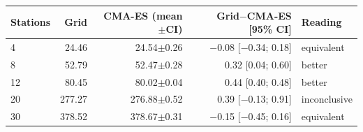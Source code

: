 \begin{tabular}{lrrrl}
\toprule
Stations & Grid & CMA-ES (mean$\pm$CI) & Grid$-$CMA-ES [95\% CI] & Reading \\
\midrule
4 & 24.46 & 24.54$\pm$0.26 & $-$0.08 [$-$0.34; 0.18] & equivalent \\
8 & 52.79 & 52.47$\pm$0.28 & 0.32 [0.04; 0.60] & better \\
12 & 80.45 & 80.02$\pm$0.04 & 0.44 [0.40; 0.48] & better \\
20 & 277.27 & 276.88$\pm$0.52 & 0.39 [$-$0.13; 0.91] & inconclusive \\
30 & 378.52 & 378.67$\pm$0.31 & $-$0.15 [$-$0.45; 0.16] & equivalent \\
\bottomrule
\end{tabular}
